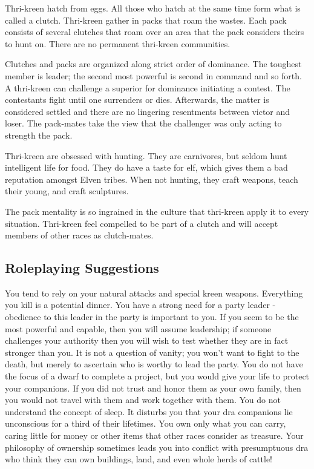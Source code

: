 Thri-kreen hatch from eggs. All those who hatch at the same time form what is called a clutch. Thri-kreen gather in packs that roam the wastes. Each pack consists of several clutches that roam over an area that the pack considers theirs to hunt on. There are no permanent thri-kreen communities.

Clutches and packs are organized along strict order of dominance. The toughest member is leader; the second most powerful is second in command and so forth. A thri-kreen can challenge a superior for dominance initiating a contest. The contestants fight until one surrenders or dies. Afterwards, the matter is considered settled and there are no lingering resentments between victor and loser. The pack-mates take the view that the challenger was only acting to strength the pack.

Thri-kreen are obsessed with hunting. They are carnivores, but seldom hunt intelligent life for food. They do have a taste for elf, which gives them a bad reputation amongst Elven tribes. When not hunting, they craft weapons, teach their young, and craft sculptures.

The pack mentality is so ingrained in the culture that thri-kreen apply it to every situation. Thri-kreen feel compelled to be part of a clutch and will accept members of other races as clutch-mates.

\subsection{Roleplaying Suggestions}

You tend to rely on your natural attacks and special kreen weapons. Everything you kill is a potential dinner. You have a strong need for a party leader - obedience to this leader in the party is important to you. If you seem to be the most powerful and capable, then you will assume leadership; if someone challenges your authority then you will wish to test whether they are in fact stronger than you. It is not a question of vanity; you won't want to fight to the death, but merely to ascertain who is worthy to lead the party. You do not have the focus of a dwarf to complete a project, but you would give your life to protect your companions. If you did not trust and honor them as your own family, then you would not travel with them and work together with them. You do not understand the concept of sleep. It disturbs you that your dra companions lie unconscious for a third of their lifetimes. You own only what you can carry, caring little for money or other items that other races consider as treasure. Your philosophy of ownership sometimes leads you into conflict with presumptuous dra who think they can own buildings, land, and even whole herds of cattle!


